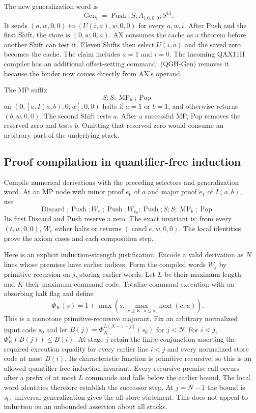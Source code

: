 The new generalization word is
\begin{equation}
 \operatorname{Gen}_i=\operatorname{Push};S;
                   A_{i,0,0,0};S^{11}.
 \tag{QGH-Gen}
\end{equation}
It sends $(a,w,0,0)$ to $(U(i,a),w,0,0)$ for every $a,w,i$.
After Push and the first Shift, the store is $(0,w,0,a)$.
AX consumes the cache as a theorem before another Shift can test it.
Eleven Shifts then select $U(i,a)$ and the saved zero becomes the cache.
The claim includes $a=1$ and $i=0$.  The incoming QAX11H compiler has
an additional offset-setting command; (QGH-Gen) removes it because
the binder now comes directly from AX's operand.

The MP suffix
\[
 S;S;\operatorname{MP}_b;\operatorname{Pop}
\]
on $(0,[a,I(a,b),0;w],0,0)$ halts if $a=1$ or $b=1$, and otherwise
returns $(b,w,0,0)$.  The second Shift tests $a$.  After a successful
MP, Pop removes the reserved zero and tests $b$.  Omitting that
reserved zero would consume an arbitrary part of the underlying stack.

\subsection{Proof compilation in quantifier-free induction}

Compile numerical derivations with the preceding selectors and
generalization word.  At an MP node with minor proof $e_0$ of $a$
and major proof $e_1$ of $I(a,b)$, use
\[
 \operatorname{Discard};\operatorname{Push};W_{e_1};
 \operatorname{Push};W_{e_0};\operatorname{Push};
 S;S;\operatorname{MP}_b;\operatorname{Pop}.
\]
Its first Discard and Push reserve a zero.  The exact invariant is:
from every $(t,w,0,0)$, $W_e$ either halts or returns
$(\operatorname{concl}e,w,0,0)$.  The local identities prove the
axiom cases and each composition step.

Here is an explicit induction-strength justification.  Encode a valid
derivation as $N$ lines whose premises have earlier indices.  Form the
compiled words $W_j$ by primitive recursion on $j$, storing earlier
words.  Let $L$ be their maximum length and $K$ their maximum command
code.  Totalize command execution with an absorbing halt flag and define
\[
 \Phi_K(s)=1+\max\left(s,
       \max_{c\le K,\ u\le s}\operatorname{next}(c,u)\right).
\]
This is a monotone primitive-recursive majorant.  Fix an arbitrary
normalized input code $s_0$ and let
$B(j)=\Phi_K^{L(N-1-j)}(s_0)$ for $j<N$.
For $i<j$, $\Phi_K^L(B(j))\le B(i)$.
At stage $j$ retain the finite conjunction asserting the required
execution equality for every earlier line $i<j$ and every normalized
store code at most $B(i)$.  Its characteristic function is primitive
recursive, so this is an allowed quantifier-free induction invariant.
Every recursive premise call occurs after a prefix of at most $L$
commands and falls below the earlier bound.  The local word identities
therefore establish the successor step.  At $j=N-1$ the bound is
$s_0$; universal generalization gives the all-store statement.
This does not appeal to induction on an unbounded assertion about all
stacks.

